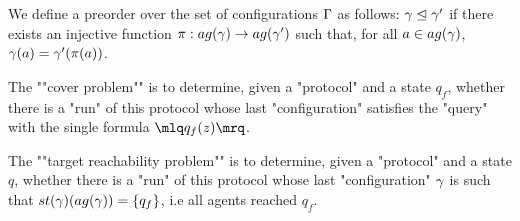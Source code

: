 	
	\begin{definition}
		We define a preorder over the set of configurations $\Gamma$ as follows: $\gamma \trianglelefteq \gamma'$ if there exists an injective function $\pi: \agentsof{\config} \rightarrow \agentsof{\config'}$ such that, for all $a \in \agentsof{\config}$, $\gamma(a) = \gamma'(\pi(a))$. 
	\end{definition}
	
%			
%			
%		
\begin{definition}

	\AP The ""cover problem"" is to determine, given a "protocol" and a state $q_f$, whether there is a "run" of this protocol whose last "configuration" satisfies the "query" with the single formula $\quotemarks{q_f(\var{z})}$.
	
	\AP The ""target reachability problem"" is to determine, given a "protocol" and a state $q$, whether there is a "run" of this protocol whose last "configuration" $\gamma$ is such that $\st{\config}(\agentsof{\gamma}) = \{q_f\}$, i.e all agents reached $q_f$.
	
	
\end{definition}

